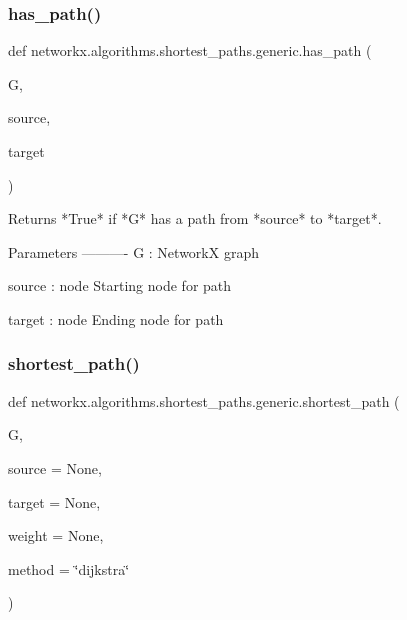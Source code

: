  \mbox{\label{namespacenetworkx_1_1algorithms_1_1shortest__paths_1_1generic_aa9004ba323dd9fd872d3e97769f28e1d}} 
\subsubsection{\texorpdfstring{has\+\_\+path()}{has\_path()}}
{\footnotesize\ttfamily def networkx.\+algorithms.\+shortest\+\_\+paths.\+generic.\+has\+\_\+path (\begin{DoxyParamCaption}\item[{}]{G,  }\item[{}]{source,  }\item[{}]{target }\end{DoxyParamCaption})}

\begin{DoxyVerb}Returns *True* if *G* has a path from *source* to *target*.

Parameters
----------
G : NetworkX graph

source : node
   Starting node for path

target : node
   Ending node for path
\end{DoxyVerb}
 \mbox{\label{namespacenetworkx_1_1algorithms_1_1shortest__paths_1_1generic_ac7e350c9388364d06e2a82553130da2b}} 
\subsubsection{\texorpdfstring{shortest\+\_\+path()}{shortest\_path()}}
{\footnotesize\ttfamily def networkx.\+algorithms.\+shortest\+\_\+paths.\+generic.\+shortest\+\_\+path (\begin{DoxyParamCaption}\item[{}]{G,  }\item[{}]{source = {\ttfamily None},  }\item[{}]{target = {\ttfamily None},  }\item[{}]{weight = {\ttfamily None},  }\item[{}]{method = {\ttfamily \char`\"{}dijkstra\char`\"{}} }\end{DoxyParamCaption})}

